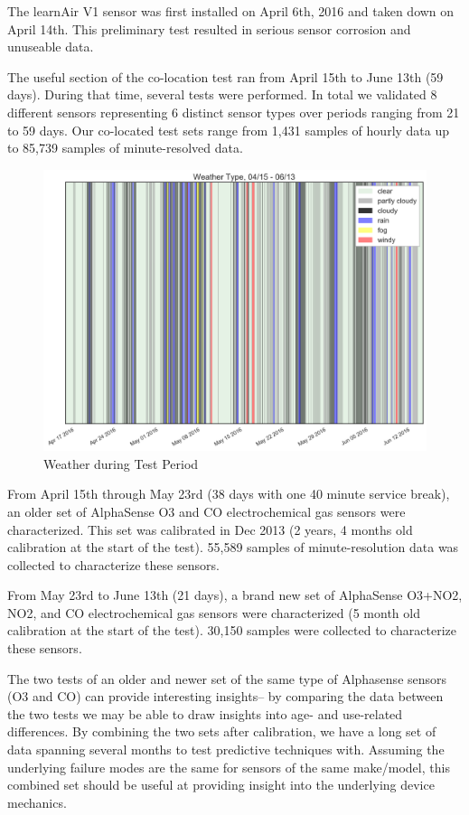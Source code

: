 The learnAir V1 sensor was first installed on April 6th, 2016 and taken down on April 14th.  This preliminary test resulted in serious sensor corrosion and unuseable data.

The useful section of the co-location test ran from April 15th to June 13th (59 days).  During that time, several tests were performed.  In total we validated 8 different sensors representing 6 distinct sensor types over periods ranging from 21 to 59 days.  Our co-located test sets range from 1,431 samples of hourly data up to 85,739 samples of minute-resolved data.  


\begin{figure}[htb]
 	\includegraphics[width=\textwidth-0.5cm]{figs/weather}               
 	 \caption{Weather during Test Period}
  	\label{fig:weather}
\end{figure}


From April 15th through May 23rd (38 days with one 40 minute service break), an older set of AlphaSense O3 and CO electrochemical gas sensors were characterized.  This set was calibrated in Dec 2013 (2 years, 4 months old calibration at the start of the test).  55,589 samples of minute-resolution data was collected to characterize these sensors.

From May 23rd to June 13th (21 days), a brand new set of AlphaSense O3+NO2, NO2, and CO electrochemical gas sensors were characterized (5 month old calibration at the start of the test).  30,150 samples were collected to characterize these sensors.

The two tests of an older and newer set of the same type of Alphasense sensors (O3 and CO) can provide interesting insights-- by comparing the data between the two tests we may be able to draw insights into age- and use-related differences.  By combining the two sets after calibration, we have a long set of data spanning several months to test predictive techniques with.  Assuming the underlying failure modes are the same for sensors of the same make/model, this combined set should be useful at providing insight into the underlying device mechanics.


